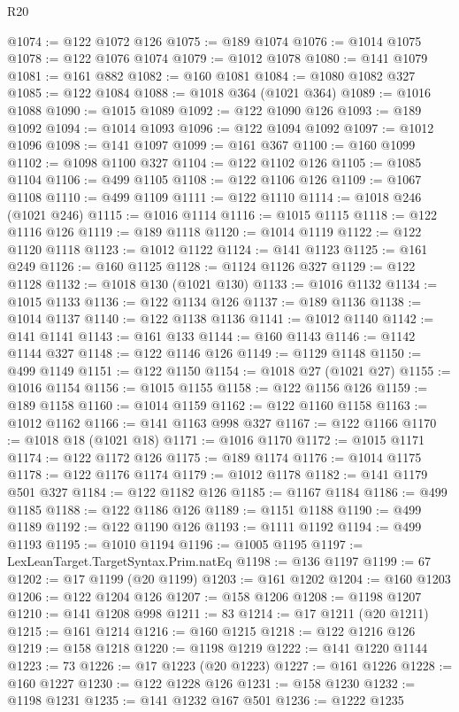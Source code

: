 \begin{lexlean}{R20}
\begin{coremodule}
@1074 := @122 @1072 @126
@1075 := @189 @1074
@1076 := @1014 @1075
@1078 := @122 @1076 @1074
@1079 := @1012 @1078
@1080 := @141 @1079
@1081 := @161 @882
@1082 := @160 @1081
@1084 := @1080 @1082 @327
@1085 := @122 @1084
@1088 := @1018 @364 (@1021 @364)
@1089 := @1016 @1088
@1090 := @1015 @1089
@1092 := @122 @1090 @126
@1093 := @189 @1092
@1094 := @1014 @1093
@1096 := @122 @1094 @1092
@1097 := @1012 @1096
@1098 := @141 @1097
@1099 := @161 @367
@1100 := @160 @1099
@1102 := @1098 @1100 @327
@1104 := @122 @1102 @126
@1105 := @1085 @1104
@1106 := @499 @1105
@1108 := @122 @1106 @126
@1109 := @1067 @1108
@1110 := @499 @1109
@1111 := @122 @1110
@1114 := @1018 @246 (@1021 @246)
@1115 := @1016 @1114
@1116 := @1015 @1115
@1118 := @122 @1116 @126
@1119 := @189 @1118
@1120 := @1014 @1119
@1122 := @122 @1120 @1118
@1123 := @1012 @1122
@1124 := @141 @1123
@1125 := @161 @249
@1126 := @160 @1125
@1128 := @1124 @1126 @327
@1129 := @122 @1128
@1132 := @1018 @130 (@1021 @130)
@1133 := @1016 @1132
@1134 := @1015 @1133
@1136 := @122 @1134 @126
@1137 := @189 @1136
@1138 := @1014 @1137
@1140 := @122 @1138 @1136
@1141 := @1012 @1140
@1142 := @141 @1141
@1143 := @161 @133
@1144 := @160 @1143
@1146 := @1142 @1144 @327
@1148 := @122 @1146 @126
@1149 := @1129 @1148
@1150 := @499 @1149
@1151 := @122 @1150
@1154 := @1018 @27 (@1021 @27)
@1155 := @1016 @1154
@1156 := @1015 @1155
@1158 := @122 @1156 @126
@1159 := @189 @1158
@1160 := @1014 @1159
@1162 := @122 @1160 @1158
@1163 := @1012 @1162
@1166 := @141 @1163 @998 @327
@1167 := @122 @1166
@1170 := @1018 @18 (@1021 @18)
@1171 := @1016 @1170
@1172 := @1015 @1171
@1174 := @122 @1172 @126
@1175 := @189 @1174
@1176 := @1014 @1175
@1178 := @122 @1176 @1174
@1179 := @1012 @1178
@1182 := @141 @1179 @501 @327
@1184 := @122 @1182 @126
@1185 := @1167 @1184
@1186 := @499 @1185
@1188 := @122 @1186 @126
@1189 := @1151 @1188
@1190 := @499 @1189
@1192 := @122 @1190 @126
@1193 := @1111 @1192
@1194 := @499 @1193
@1195 := @1010 @1194
@1196 := @1005 @1195
@1197 := LexLeanTarget.TargetSyntax.Prim.natEq
@1198 := @136 @1197
@1199 := 67
@1202 := @17 @1199 (@20 @1199)
@1203 := @161 @1202
@1204 := @160 @1203
@1206 := @122 @1204 @126
@1207 := @158 @1206
@1208 := @1198 @1207
@1210 := @141 @1208 @998
@1211 := 83
@1214 := @17 @1211 (@20 @1211)
@1215 := @161 @1214
@1216 := @160 @1215
@1218 := @122 @1216 @126
@1219 := @158 @1218
@1220 := @1198 @1219
@1222 := @141 @1220 @1144
@1223 := 73
@1226 := @17 @1223 (@20 @1223)
@1227 := @161 @1226
@1228 := @160 @1227
@1230 := @122 @1228 @126
@1231 := @158 @1230
@1232 := @1198 @1231
@1235 := @141 @1232 @167 @501
@1236 := @1222 @1235

\end{coremodule}
\end{lexlean}
